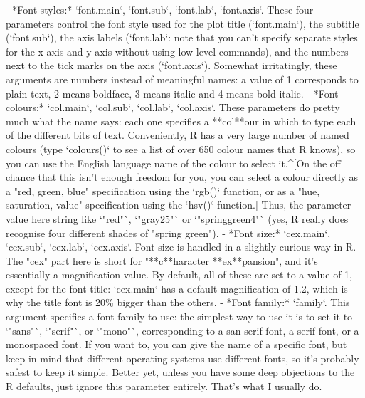 - *Font styles:* `font.main`, `font.sub`, `font.lab`, `font.axis`. These four parameters control the font style used for the plot title (`font.main`), the subtitle (`font.sub`), the axis labels (`font.lab`: note that you can't specify separate styles for the x-axis and y-axis without using low level commands), and the numbers next to the tick marks on the axis (`font.axis`). Somewhat irritatingly, these arguments are numbers instead of meaningful names:  a value of 1 corresponds to plain text, 2 means boldface, 3 means italic and 4 means bold italic.
- *Font colours:* `col.main`, `col.sub`, `col.lab`, `col.axis`. These parameters do pretty much what the name says: each one specifies a **col**our in which to type each of the different bits of text. Conveniently, R has a very large number of named colours (type `colours()` to see a list of over 650 colour names that R knows), so you can use the English language name of the colour to select it.^[On the off chance that this isn't enough freedom for you, you can select a colour directly as a "red, green, blue" specification using the `rgb()` function, or as a "hue, saturation, value" specification using the `hsv()` function.] Thus, the parameter value here string like `"red"`, `"gray25"` or `"springgreen4"` (yes, R really does recognise four different shades of "spring green").
- *Font size:* `cex.main`, `cex.sub`, `cex.lab`, `cex.axis`. Font size is handled in a slightly curious way in R. The "cex" part here is short for "**c**haracter **ex**pansion", and it's essentially a magnification value. By default, all of these are set to a value of 1, except for the font title: `cex.main` has a default magnification of 1.2, which is why the title font is 20\% bigger than the others. 
- *Font family:* `family`. This argument specifies a font family to use: the simplest way to use it is to set it to `"sans"`, `"serif"`, or `"mono"`, corresponding to a san serif font, a serif font, or a monospaced font. If you want to, you can give the name of a specific font, but keep in mind that different operating systems use different fonts, so it's probably safest to keep it simple. Better yet, unless you have some deep objections to the R defaults, just ignore this parameter entirely. That's what I usually do.

